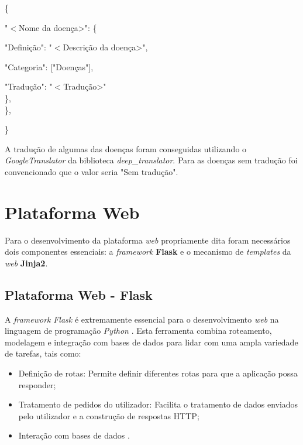 \begin{center}
    \{\\
\end{center}
\begin{center}
    "\(<\)Nome da doença>": \{ \\
\end{center}
\begin{center}
        "Definição": "\(<\)Descrição da doença>",\\
\end{center}
\begin{center}
        "Categoria": ["Doenças"],\\
\end{center}
\begin{center}
        "Tradução": "\(<\)Tradução>"\\
    \},\\
    \},\\
\end{center}
\begin{center}
\}
\end{center}


A tradução de algumas das doenças foram conseguidas utilizando o \textit{GoogleTranslator} da biblioteca \textit{deep\_translator}. Para as doenças sem tradução foi convencionado que o valor seria "Sem tradução".

\section{Plataforma Web}

Para o desenvolvimento da plataforma \textit{web} propriamente dita foram necessários dois componentes essenciais: a \textit{framework} \textbf{Flask} e o mecanismo de \textit{templates} da \textit{web} \textbf{Jinja2}.

\subsection{Plataforma Web - Flask}
A \textit{framework}  \textit{Flask} é extremamente essencial para o desenvolvimento \textit{web} na linguagem de programação \textit{Python} \cite{Flask2023}. Esta ferramenta combina roteamento, modelagem e integração com bases de dados para lidar com uma ampla variedade de tarefas, tais como:
\begin{itemize}
    \item Definição de rotas: Permite definir diferentes rotas para que a aplicação possa responder;
    \item Tratamento de pedidos do utilizador: Facilita o tratamento de dados enviados pelo utilizador e a construção de respostas HTTP;
    \item Interação com bases de dados \cite{Flask2023}.
\end{itemize}

